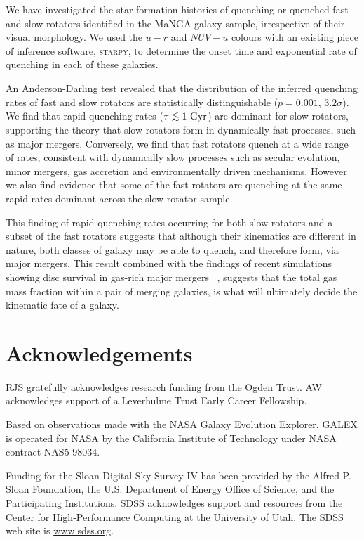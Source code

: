 \documentclass[useAMS,usenatbib]{mn2e}
\def\lesssim{\mathrel{\hbox{\rlap{\hbox{\lower3pt\hbox{$\sim$}}}\hbox{\raise2pt\hbox{$<$}}}}}
\begin{document}
We have investigated the star formation histories of quenching or quenched fast and slow rotators identified in the MaNGA galaxy sample, irrespective of their visual morphology. We used the $u-r$ and $NUV-u$ colours with an existing piece of inference software, \textsc{starpy}, to determine the onset time and exponential rate of quenching in each of these galaxies. 

An Anderson-Darling test revealed that the distribution of the inferred quenching rates of fast and slow rotators are statistically distinguishable ($p=0.001$, $3.2\sigma$). We find that rapid quenching rates ($\tau \lesssim 1~\rm{Gyr}$) are dominant for slow rotators, supporting the theory that slow rotators form in dynamically fast processes, such as major mergers. Conversely, we find that fast rotators quench at a wide range of rates, consistent with dynamically slow processes such as secular evolution, minor mergers, gas accretion and environmentally driven mechanisms. However we also find evidence that some of the fast rotators are quenching at the same rapid rates dominant across the slow rotator sample.

This finding of rapid quenching rates occurring for both slow rotators and a subset of the fast rotators suggests that although their kinematics are different in nature, both classes of galaxy may be able to quench, and therefore form, via major mergers. This result combined with the findings of recent simulations showing disc survival in gas-rich major mergers ~\citep{bois11, pontzen16, sparre16}, suggests that the total gas mass fraction within a pair of merging galaxies, is what will ultimately decide the kinematic fate of a galaxy. 
	
\section*{Acknowledgements}

RJS gratefully acknowledges research funding from the Ogden Trust. AW acknowledges support of a Leverhulme Trust Early Career Fellowship.

Based on observations made with the NASA Galaxy Evolution Explorer.  GALEX is operated for NASA by the California Institute of Technology under NASA contract NAS5-98034.

Funding for the Sloan Digital Sky Survey IV has been provided by the Alfred P. Sloan Foundation, the U.S. Department of Energy Office of Science, and the Participating Institutions. SDSS acknowledges support and resources from the Center for High-Performance Computing at the University of Utah. The SDSS web site is \url{www.sdss.org}.
\end{document}
